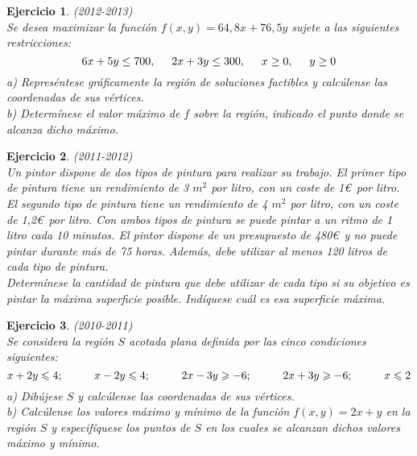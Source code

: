 \documentclass[12pt, a4paper]{amsart}
\newtheorem{ejer}{Ejercicio}
\begin{document}
\begin{ejer}\em (2012-2013)\\
Se desea maximizar la función $f(x,y)=64,8x+76,5y$ sujete a las siguientes restricciones:
\[6x+5y\leq 700,\hspace*{0.5cm} 2x+3y\leq 300,\hspace*{0.5cm} x\geq 0,\hspace*{0.5cm} y\geq 0\]
a) Represéntese gráficamente la región de soluciones factibles y calcúlense las coordenadas de sus vértices.\\
b) Determínese el valor máximo de $f$ sobre la región, indicado el punto donde se alcanza dicho máximo.
\end{ejer}

\newpage

\begin{ejer}\em (2011-2012)\\
Un pintor dispone de dos tipos de pintura para realizar su trabajo. El primer tipo de pintura tiene un rendimiento de 3 $m^2$ por litro, con un coste de 1\euro\ por litro. 
El segundo tipo de pintura tiene un rendimiento de 4 $m^2$ por litro, con un coste de 1,2\euro\ por litro. Con ambos tipos de pintura se puede pintar a un ritmo de 1 litro cada 10 minutos. El pintor dispone de un presupuesto de 480\euro\ y no puede pintar durante más de 75 horas. Además, debe utilizar al menos 120 litros de cada tipo de pintura.\\
Determínese la cantidad de pintura que debe utilizar de cada tipo si su objetivo es pintar la máxima superficie posible. Indíquese cuál es esa superficie máxima.
\end{ejer}

\begin{ejer}\em (2010-2011)\\
Se considera la región $S$ acotada plana definida por las cinco condiciones siguientes:
\[x+2y\leqslant 4;\hspace*{1cm} x-2y\leqslant 4;\hspace*{1cm} 2x-3y\geqslant -6;\hspace*{1cm} 2x+3y\geqslant -6;\hspace*{1cm} x\leqslant 2\]
a) Dibújese $S$ y calcúlense las coordenadas de sus vértices.\\
b) Calcúlense los valores máximo y mínimo de la función $f(x,y)=2x+y$ en la región $S$ y especifíquese los puntos de $S$ en los cuales se alcanzan dichos valores máximo y mínimo.
\end{ejer}
\end{document}
